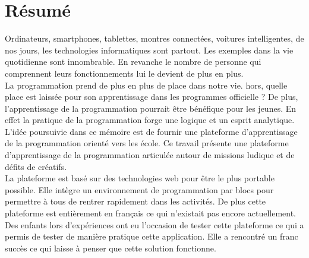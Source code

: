 \section*{Résumé}
Ordinateurs, smartphones, tablettes, montres connectées, voitures intelligentes, de nos jours, les technologies informatiques sont partout. Les exemples dans la vie quotidienne sont innombrable. En revanche le nombre de personne qui comprennent leurs fonctionnements lui le devient de plus en plus. \\

La programmation prend de plus en plus de place dans notre vie. hors, quelle place est laissée pour son apprentissage dans les programmes officielle ? De plus, l'apprentissage de la programmation pourrait être bénéfique pour les jeunes. En effet la pratique de la programmation forge une logique et un esprit analytique.\\

L'idée poursuivie dans ce mémoire est de fournir une plateforme d'apprentissage de la programmation orienté vers les école. Ce travail présente une plateforme d'apprentissage de la programmation articulée autour de missions ludique et de défits de créatifs.\\

La plateforme est basé sur des technologies web pour être le plus portable possible. Elle intègre un environnement de programmation par blocs pour permettre à tous de rentrer rapidement dans les activités. De plus cette plateforme est entièrement en français ce qui n'existait pas encore actuellement.\\

Des enfants lors d'expériences ont eu l'occasion de tester cette plateforme ce qui a permis de tester de manière pratique cette application. Elle a rencontré un franc succès ce qui laisse à penser que cette solution fonctionne.


